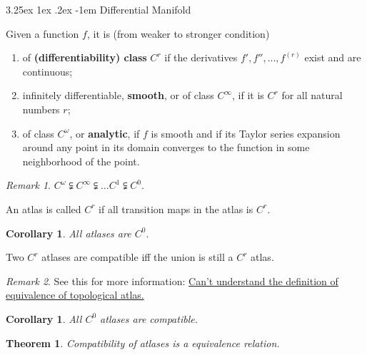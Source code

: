 \documentclass[12pt, letterpaper]{article}
\makeatletter
\newtheorem{cor}[prop]{Corollary}
\newtheorem{thm}[prop]{Theorem}
\renewcommand\paragraph{\@startsection{paragraph}{4}{\z@}%
	{3.25ex \@plus1ex \@minus.2ex}%
	{-1em}%
	{\normalfont\normalsize\bfseries}}
\theoremstyle{definition}
\theoremstyle{remark}
\newtheorem*{rem*}{Remark}
\theoremstyle{definition}
\theoremstyle{plain}
\numberwithin{equation}{section}
\makeatother
\begin{document}
	\paragraph{Differential Manifold}
	
	\begin{def*}
		Given a function $f$, it is (from weaker to stronger condition)
		\begin{enumerate}
			\item of \textbf{(differentiability) class} $C^r$ if the derivatives $f', f'', ..., f^{(r)}$ exist and are continuous;
			\item infinitely differentiable, \textbf{smooth}, or of class $C^{\infty}$, if it is $C^r$ for all natural numbers $r$;
			\item of class $C^{\omega}$, or \textbf{analytic}, if $f$ is smooth and if its Taylor series expansion around any point in its domain converges to the function in some neighborhood of the point.
		\end{enumerate}
	\end{def*}
	\begin{rem*}
		$C^{\omega}\subsetneqq C^{\infty}\subsetneqq \dots C^1 \subsetneqq C^0$.
	\end{rem*}

	\begin{def*}
		An atlas is called $C^r$ if all transition maps in the atlas is $C^r$.
	\end{def*}
	\begin{cor}
		All atlases are $C^0$.
	\end{cor}

	\begin{def*}
		Two $C^r$ atlases are compatible iff the union is still a $C^r$ atlas.
	\end{def*}
	\begin{rem*}
		See this for more information:
		\href{https://math.stackexchange.com/questions/3093079/cant-understand-the-definition-of-equivalence-of-topological-atlas}{Can't understand the definition of equivalence of topological atlas.}
	\end{rem*}

	\begin{cor}
		All $C^0$ atlases are compatible.
	\end{cor}
	\begin{thm}
		Compatibility of atlases is a equivalence relation.
	\end{thm}
\end{document}
